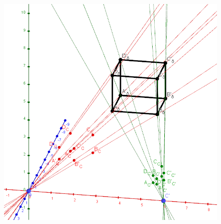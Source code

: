 %
%


\begin{figure}[!htb]
	\includegraphics[width=\linewidth]{images/ScaleInvariance_1.png}
	\caption{}
	\label{fig:scale1}
	\endminipage\hfill

\end{figure}
